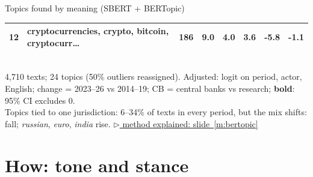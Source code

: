 \documentclass[aspectratio=169,10pt]{beamer}
\newcommand{\method}[1]{\hfill\hyperref[#1]{\tiny\textcolor{c4}{$\triangleright$ method explained: slide~\ref*{#1}}}}
\begin{document}
\begin{frame}{Topics found by meaning (SBERT + BERTopic)}
\begin{tabular}{@{}rp{}rrrrrr@{}}
12 & cryptocurrencies, crypto, bitcoin, cryptocurr\dots{} & 186 & \cellcolor{c1!27}9.0 & \cellcolor{c1!12}4.0 & \cellcolor{c1!10}3.6 & \textbf{-5.8} & {-1.1} \\
\bottomrule\end{tabular}\\[3pt]
4,710 texts; 24 topics (50\% outliers reassigned). Adjusted: logit on period, actor, English; change = 2023--26 vs 2014--19; CB = central banks vs research; \textbf{bold}: 95\% CI excludes 0.\\[2pt]
\small Topics tied to \alert{one jurisdiction}: 6--34\% of texts in every period, but the mix shifts:  fall; \emph{russian}, \emph{euro}, \emph{india} rise.
\method{m:bertopic}
\end{frame}

\section{How: tone and stance}
\end{document}

